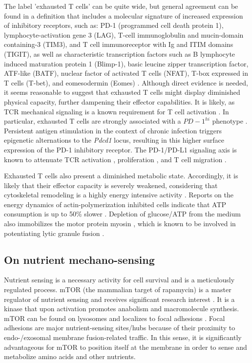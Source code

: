 The label 'exhausted T cells' can be quite wide, but general agreement can be found in a definition that includes a molecular signature of increased expression of inhibitory receptors, such as: PD-1 (programmed cell death protein 1), lymphocyte-activation gene 3 (LAG), T-cell immunoglobulin and mucin-domain containing-3 (TIM3), and T cell immunoreceptor with Ig and ITIM domains (TIGIT), as well as characteristic transcription factors such as B lymphocyte induced maturation protein 1 (Blimp-1), basic leucine zipper transcription factor, ATF-like (BATF), nuclear factor of activated T cells (NFAT), T-box expressed in T cells (T-bet), and eomesodermin (Eomes) \cite{Wherry2011, Quigley2010, Keir2008, Doering2012, Wherry2007, Wang2012,  Lazarevic2013, Rangachari2012, Shin2009, Paley2012, Larsson2013}. Although direct evidence is needed, it seems reasonable to suggest that exhausted T cells might display diminished physical capacity, further dampening their effector capabilities. It is likely, as TCR mechanical signaling is a known requirement for T cell activation \cite{Hu2016}. In particular, exhausted T cells are strongly associated with a $PD-1^{hi}$ phenotype \cite{Keir2008}. Persistent antigen stimulation in the context of chronic infection triggers epigenetic alternations to the \textit{Pdcd1} locus, resulting in this higher surface expression of the PD-1 inhibitory receptor. The PD-1/PD-L1 signaling axis is known to attenuate TCR activation \cite{Mizuno2019}, proliferation \cite{Schietinger2014}, and T cell migration \cite{Zinselmeyer2013}. 

Exhausted T cells also present a diminished metabolic state. Accordingly, it is likely that their effector capacity is severely weakened, considering that cytoskeletal remodeling is a highly energy intensive activity \cite{Bernstein2002}. Reports on the energy dynamics of actin-polymerization inhibited cells indicate that ATP consumption is up to 50\% slower \cite{Bernstein2002, Ahmed2015}. Depletion of glucose/ATP from the medium also immobilizes the motor protein myosin \cite{Xu2014}, which is known to be involved in potentiating lytic granule fusion \cite{Basu2016}.

\subsection{On nutrient mechano-sensing}

Nutrient sensing is a necessary activity for cell survival and is a meticulously regulated process. mTOR (the mammalian target of rapamycin) is a master regulator of nutrient sensing and receives significant research interest \cite{Park2020}. It is a kinase that upon activation promotes anabolism and macromolecule synthesis. mTOR can be found on lysosomes \cite{Rabanal-Ruiz2018} and localizes to focal adhesions \cite{Rabanal-Ruiz2018}. Focal adhesions are major nutrient-sensing sites/hubs \cite{Hamidi2021} because of their proximity to endo-/exosomal membrane fusion-related traffic. In this sense, it is significantly advantageous for mTOR to position itself at the membrane in order to sense and metabolize amino acids \cite{Shimobayashi2016} and other nutrients.


